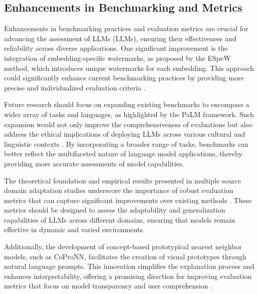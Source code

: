 \subsection{Enhancements in Benchmarking and Metrics} \label{subsec:Enhancements in Benchmarking and Metrics}



Enhancements in benchmarking practices and evaluation metrics are crucial for advancing the assessment of LLMs (LLMs), ensuring their effectiveness and reliability across diverse applications. One significant improvement is the integration of embedding-specific watermarks, as proposed by the ESpeW method, which introduces unique watermarks for each embedding. This approach could significantly enhance current benchmarking practices by providing more precise and individualized evaluation criteria \cite{wang2024espewrobustcopyrightprotection}.



Future research should focus on expanding existing benchmarks to encompass a wider array of tasks and languages, as highlighted by the PaLM framework. Such expansion would not only improve the comprehensiveness of evaluations but also address the ethical implications of deploying LLMs across various cultural and linguistic contexts \cite{chowdhery2023palm}. By incorporating a broader range of tasks, benchmarks can better reflect the multifaceted nature of language model applications, thereby providing more accurate assessments of model capabilities.



The theoretical foundation and empirical results presented in multiple source domain adaptation studies underscore the importance of robust evaluation metrics that can capture significant improvements over existing methods \cite{zhao2017multiplesourcedomainadaptation}. These metrics should be designed to assess the adaptability and generalization capabilities of LLMs across different domains, ensuring that models remain effective in dynamic and varied environments.



Additionally, the development of concept-based prototypical nearest neighbor models, such as CoProNN, facilitates the creation of visual prototypes through natural language prompts. This innovation simplifies the explanation process and enhances interpretability, offering a promising direction for improving evaluation metrics that focus on model transparency and user comprehension \cite{chiaburu2024copronnconceptbasedprototypicalnearest}.



